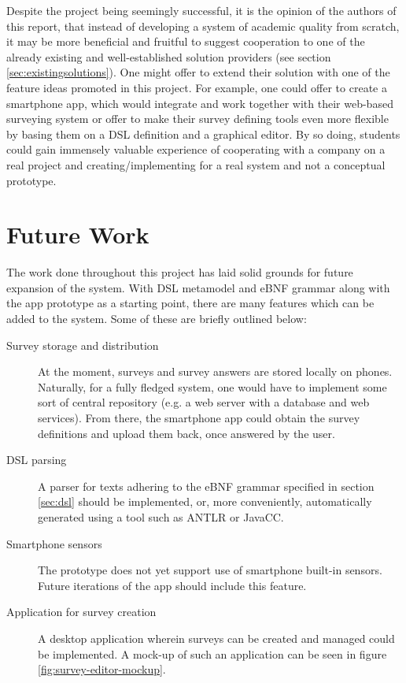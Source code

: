 Despite the project being seemingly successful, it is the opinion of the authors of this report, that instead of developing a system of academic quality from scratch, it may be more beneficial and fruitful to suggest cooperation to one of the already existing and well-established solution providers (see section \ref{sec:existingsolutions}). One might offer to extend their solution with one of the feature ideas promoted in this project. For example, one could offer to create a smartphone app, which would integrate and work together with their web-based surveying system or offer to make their survey defining tools even more flexible by basing them on a DSL definition and a graphical editor.
By so doing, students could gain immensely valuable experience of cooperating with a company on a real project and creating/implementing for a real system and not a conceptual prototype.

\section{Future Work}
\label{sec:futurework}
The work done throughout this project has laid solid grounds for future expansion of the system. With DSL metamodel and eBNF grammar along with the app prototype as a starting point, there are many features which can be added to the system. Some of these are briefly outlined below:
\begin{description}
\item[Survey storage and distribution] At the moment, surveys and survey answers are stored locally on phones. Naturally, for a fully fledged system, one would have to implement some sort of central repository (e.g. a web server with a database and web services). From there, the smartphone app could obtain the survey definitions and upload them back, once answered by the user.
\item[DSL parsing] A parser for texts adhering to the eBNF grammar specified in section \ref{sec:dsl} should be implemented, or, more conveniently, automatically generated using a tool such as ANTLR or JavaCC.
\item[Smartphone sensors] The prototype does not yet support use of smartphone built-in sensors. Future iterations of the app should include this feature.
\item[Application for survey creation] A desktop application wherein surveys can be created and managed could be implemented. A mock-up of such an application can be seen in figure \ref{fig:survey-editor-mockup}.
\end{description}